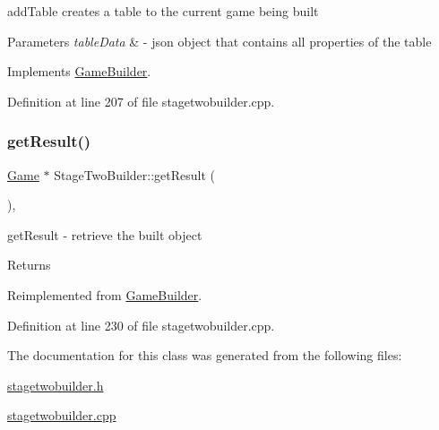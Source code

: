 add\+Table creates a table to the current game being built 


\begin{DoxyParams}{Parameters}
{\em table\+Data} & -\/ json object that contains all properties of the table \\
\hline
\end{DoxyParams}


Implements \mbox{\hyperlink{class_game_builder_a65fb629009c18956a8d592352eda1eb5}{Game\+Builder}}.



Definition at line 207 of file stagetwobuilder.\+cpp.

\mbox{\label{class_stage_two_builder_ac40c00c49b18b7c4f83f4474a8cd9c73}} 
\subsubsection{\texorpdfstring{get\+Result()}{getResult()}}
{\footnotesize\ttfamily \mbox{\hyperlink{class_game}{Game}} $\ast$ Stage\+Two\+Builder\+::get\+Result (\begin{DoxyParamCaption}{ }\end{DoxyParamCaption})\hspace{0.3cm}{\ttfamily [override]}, {\ttfamily [virtual]}}



get\+Result -\/ retrieve the built object 

\begin{DoxyReturn}{Returns}

\end{DoxyReturn}


Reimplemented from \mbox{\hyperlink{class_game_builder_a490e3dbb7f8289edb2a080a3383f8607}{Game\+Builder}}.



Definition at line 230 of file stagetwobuilder.\+cpp.



The documentation for this class was generated from the following files\+:\begin{DoxyCompactItemize}
\item 
\mbox{\hyperlink{stagetwobuilder_8h}{stagetwobuilder.\+h}}\item 
\mbox{\hyperlink{stagetwobuilder_8cpp}{stagetwobuilder.\+cpp}}\end{DoxyCompactItemize}
